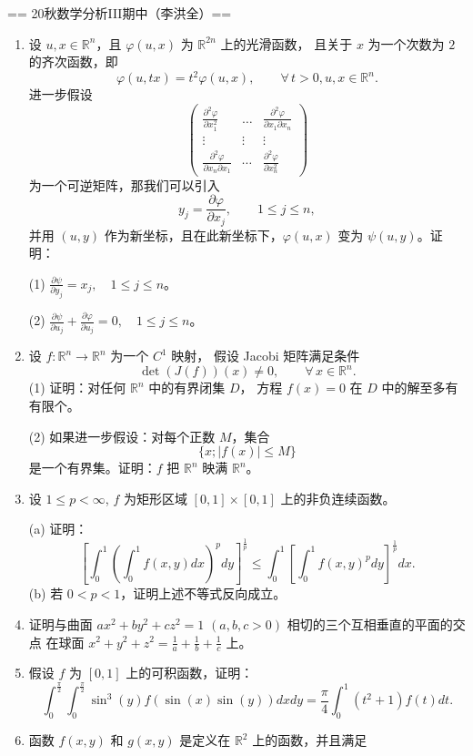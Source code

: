 == 20秋数学分析III期中（李洪全）==
\begin{enumerate}
\item 设 $u, x \in \mathbb{R}^{n}$，且 $\varphi(u, x)$ 为 $\mathbb{R}^{2n}$ 上的光滑函数，
且关于 $x$ 为一个次数为 $2$ 的齐次函数，即
\[\varphi(u, tx)=t^{2} \varphi(u, x), 
\qquad \forall\, t>0, u, x \in \mathbb{R}^{n}. \tag{1}\]
进一步假设
\[\begin{pmatrix}
\frac{\partial^{2} \varphi}{\partial x_{1}^{2}} & \ldots & \frac{\partial^{2} \varphi}{\partial x_{1} \partial x_{n}}  \\
\vdots & \vdots & \vdots \\
\frac{\partial^{2} \varphi}{\partial x_{n} \partial x_{1}} & \cdots & \frac{\partial^{2} \varphi}{\partial x_{n}^{2}}
\end{pmatrix}\tag{2}\]
为一个可逆矩阵，那我们可以引入
\[y_{j}=\frac{\partial \varphi}{\partial x_{j}}, \qquad 1 \leq j \leq n,\]
并用 $(u, y)$ 作为新坐标，且在此新坐标下，$\varphi(u, x)$ 变为 $\psi(u, y)$。证明：

(1) $\frac{\partial \psi}{\partial y_{j}}=x_{j}, \quad 1 \leq j \leq n$。

(2) $\frac{\partial \psi}{\partial u_{j}}+\frac{\partial \varphi}{\partial u_{j}}=0, \quad 1 \leq j \leq n$。
\item 设 $f: \mathbb{R}^{n} \rightarrow \mathbb{R}^{n}$ 为一个 $C^{1}$ 映射，
假设 Jacobi 矩阵满足条件
\[\det(J(f))(x) \neq 0, \qquad \forall \, x \in \mathbb{R}^{n}.\]
(1) 证明：对任何 $\mathbb{R}^{n}$ 中的有界闭集 $D$，
方程 $f(x)=0$ 在 $D$ 中的解至多有有限个。

(2) 如果进一步假设：对每个正数 $M$，集合
\[\{x ;|f(x)| \leq M\}\]
是一个有界集。证明：$f$ 把 $\mathbb{R}^{n}$ 映满 $\mathbb{R}^{n}$。
\item 设 $1 \leq p<\infty$, $f$ 为矩形区域 $[0,1] \times [0,1]$ 上的非负连续函数。

(a) 证明：
\[\left[\int_{0}^{1}\left(\int_{0}^{1} f(x, y) dx\right)^{p} dy\right]^{\frac{1}{p}} 
\leq \int_{0}^{1}\left[\int_{0}^{1} f(x, y)^{p} dy\right]^{\frac{1}{p}} dx.\]
(b) 若 $0<p<1$，证明上述不等式反向成立。
\item 证明与曲面 $a x^{2}+b y^{2}+c z^{2}=1$ $(a, b, c>0)$ 相切的三个互相垂直的平面的交点
在球面 $x^{2}+y^{2}+z^{2}=\frac{1}{a}+\frac{1}{b}+\frac{1}{c}$ 上。
\item 假设 $f$ 为 $[0,1]$ 上的可积函数，证明：
\[\int_{0}^{\frac{\pi}{2}} \int_{0}^{\frac{\pi}{2}} \sin^{3}(y) f(\sin (x) \sin (y)) dx dy
=\frac{\pi}{4} \int_{0}^{1}(t^{2}+1) f(t) dt.\]
\item 函数 $f(x, y)$ 和 $g(x, y)$ 是定义在 $\mathbb{R}^{2}$ 上的函数，并且满足


\end{enumerate}
